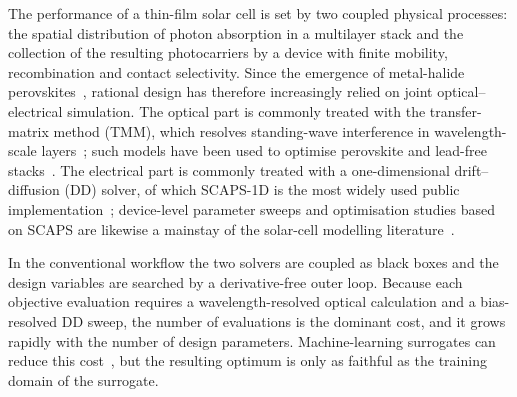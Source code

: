 \documentclass[preprint,12pt]{elsarticle}
\begin{document}
The performance of a thin-film solar cell is set by two coupled physical
processes: the spatial distribution of photon absorption in a multilayer stack
and the collection of the resulting photocarriers by a device with finite
mobility, recombination and contact selectivity. Since the emergence of
metal-halide perovskites~\cite{green2014}, rational design has therefore
increasingly relied on joint optical--electrical simulation. The optical part
is commonly treated with the transfer-matrix method (TMM), which resolves
standing-wave interference in wavelength-scale layers~\cite{byrnes2016,
pettersson1999}; such models have been used to optimise perovskite and
lead-free stacks~\cite{sachchidanand2023, jangjoy2022}. The
electrical part is commonly treated with a one-dimensional drift--diffusion
(DD) solver, of which SCAPS-1D is the most widely used public
implementation~\cite{burgelman2000}; device-level parameter sweeps and
optimisation studies based on SCAPS are likewise a mainstay of the
solar-cell modelling literature~\cite{pindolia2022, kaur2023}.

In the conventional workflow the two solvers are coupled as black boxes and
the design variables are searched by a derivative-free outer loop. Because
each objective evaluation requires a wavelength-resolved optical calculation
and a bias-resolved DD sweep, the number of evaluations is the dominant cost,
and it grows rapidly with the number of design parameters. Machine-learning
surrogates can reduce this cost~\cite{kaur2023}, but the resulting optimum is
only as faithful as the training domain of the surrogate.
\end{document}
